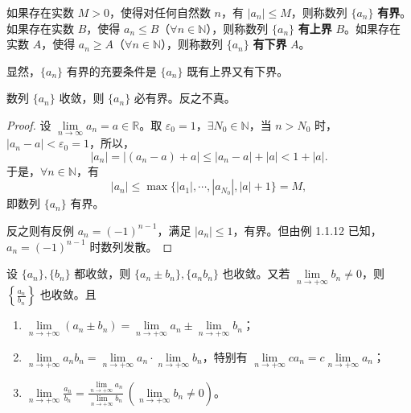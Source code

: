 \begin{definition}\label{def:1.2.1}
如果存在实数 $M>0$，使得对任何自然数 $n$，有 $|a_{n}| \leqslant M$，则称数列 $\{a_{n}\}$ \textbf{有界}。如果存在实数 $B$，使得 $a_{n} \leqslant B$（$\forall n \in \mathbb{N}$），则称数列 $\{a_{n}\}$ \textbf{有上界} $B$。如果存在实数 $A$，使得 $a_{n} \geqslant A$（$\forall n \in \mathbb{N}$），则称数列 $\{a_{n}\}$ \textbf{有下界} $A$。
\end{definition}

显然，$\{a_{n}\}$ 有界的充要条件是 $\{a_{n}\}$ 既有上界又有下界。

\begin{theorem}\label{thm:1.2.2}
数列 $\{a_{n}\}$ 收敛，则 $\{a_{n}\}$ 必有界。反之不真。
\end{theorem}

\begin{proof}
设 $\lim\limits_{n \to \infty} a_n = a \in \mathbb{R}$。取 $\varepsilon_0 = 1$，$\exists N_0 \in \mathbb{N}$，当 $n > N_0$ 时，$|a_n - a| < \varepsilon_0 = 1$，所以，
\[
|a_{n}| = |(a_{n}-a)+a| \leqslant |a_{n}-a| + |a| < 1 + |a|.
\]
于是，$\forall n \in \mathbb{N}$，有
\[
|a_{n}| \leqslant \max\{|a_{1}|, \cdots, |a_{N_{0}}|, |a|+1\} = M,
\]
即数列 $\{a_{n}\}$ 有界。

反之则有反例 $a_{n}=(-1)^{n-1}$，满足 $|a_{n}| \leqslant 1$，有界。但由例 1.1.12 已知，$a_{n}=(-1)^{n-1}$ 时数列发散。
\end{proof}

\begin{theorem}[极限的四则运算]\label{thm:1.2.3}
设 $\{a_{n}\}, \{b_{n}\}$ 都收敛，则 $\{a_{n}\pm b_{n}\}, \{a_{n}b_{n}\}$ 也收敛。又若 $\lim\limits_{n\to+\infty}b_{n}\neq0$，则 $\left\{\frac{a_{n}}{b_{n}}\right\}$ 也收敛。且
\begin{enumerate}
  \item $\lim\limits_{n \to +\infty} (a_n \pm b_n) = \lim\limits_{n \to +\infty} a_n \pm \lim\limits_{n \to +\infty} b_n$；
  \item $\lim\limits_{n\to+\infty} a_n b_n = \lim\limits_{n\to+\infty} a_n \cdot \lim\limits_{n\to+\infty} b_n$，特别有 $\lim\limits_{n\to+\infty} c a_n = c \lim\limits_{n\to+\infty} a_n$；
  \item $\lim\limits_{n \to +\infty} \frac{a_n}{b_n} = \frac{\lim\limits_{n \to +\infty} a_n}{\lim\limits_{n \to +\infty} b_n}\ (\lim\limits_{n \to +\infty} b_n \neq 0)$。
\end{enumerate}
\end{theorem}

